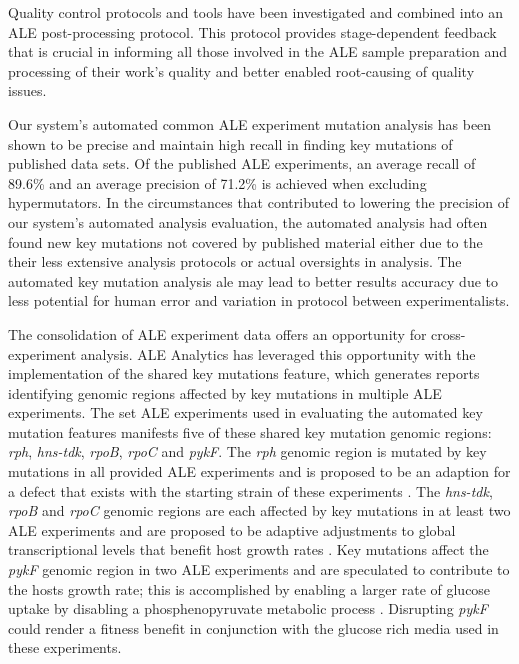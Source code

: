 \documentclass[12pt,final,masters,chapterheads]{ucsd}  %
\begin{document}
Quality control protocols and tools have been investigated and combined into an ALE post-processing protocol. This protocol provides stage-dependent feedback that is crucial in informing all those involved in the ALE sample preparation and processing of their work's quality and better enabled root-causing of quality issues.

Our system's automated common ALE experiment mutation analysis has been shown to be precise and maintain high recall in finding key mutations of published data sets. Of the published ALE experiments, an average recall of 89.6\% and an average precision of 71.2\% is achieved when excluding hypermutators. In the circumstances that contributed to lowering the precision of our system's automated analysis evaluation, the automated analysis had often found new key mutations not covered by published material either due to the their less extensive analysis protocols or actual oversights in analysis. The automated key mutation analysis ale may lead to better results accuracy due to less potential for human error and variation in protocol between experimentalists.

The consolidation of ALE experiment data offers an opportunity for cross-experiment analysis. ALE Analytics has leveraged this opportunity with the implementation of the shared key mutations feature, which generates reports identifying genomic regions affected by key mutations in multiple ALE experiments. The set ALE experiments used in evaluating the automated key mutation features manifests five of these shared key mutation genomic regions: \textit{rph}, \textit{hns-tdk}, \textit{rpoB}, \textit{rpoC} and \textit{pykF}. The \textit{rph} genomic region is mutated by key mutations in all provided ALE experiments and is proposed to be an adaption for a defect that exists with the starting strain of these experiments \cite{Conrad2009}. The \textit{hns-tdk}, \textit{rpoB} and \textit{rpoC} genomic regions are each affected by key mutations in at least two ALE experiments and are proposed to be adaptive adjustments to global transcriptional levels that benefit host growth rates \cite{Kobayashi01011990, AYERS1989749, Cheng2014, Wang1445}. Key mutations affect the \textit{pykF} genomic region in two ALE experiments and are speculated to contribute to the hosts growth rate; this is accomplished by enabling a larger rate of glucose uptake by disabling a phosphenopyruvate metabolic process \cite{Woods13062006, 10.1371/journal.pgen.1001164, Blank25022014}. Disrupting \textit{pykF} could render a fitness benefit in conjunction with the glucose rich media used in these experiments.
\end{document}
